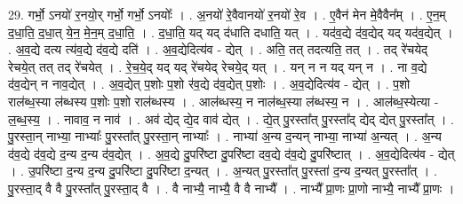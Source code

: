 \documentclass[17pt]{extarticle}
\begin{document}
29. गर्भो॒ ऽनयो॑ र॒नयो॒र् गर्भो॒ गर्भो॒ ऽनयोः᳚ । . अ॒नयो॑ रे॒वैवानयो॑ र॒नयो॑ रे॒व । . ए॒वैन॑ मेन मे॒वैवैन᳚म् । . ए॒न॒म् द॒धा॒ति॒ द॒धा॒त् ये॒न॒ मे॒न॒म् द॒धा॒ति॒ । . द॒धा॒ति॒ यद् यद् द॑धाति दधाति॒ यत् । . यद॑व॒द्ये द॑व॒द्येद् यद् यद॑व॒द्येत् । . अ॒व॒द्ये दत्य त्य॑व॒द्ये द॑व॒द्ये दति॑ । . अ॒व॒द्येदित्य॑व - द्येत् । . अति॒ तत् तदत्यति॒ तत् । . तद् रे॑चयेद् रेचये॒त् तत् तद् रे॑चयेत् । . रे॒च॒ये॒द् यद् यद् रे॑चयेद् रेचये॒द् यत् । . यन् न न यद् यन् न । . ना व॒द्ये द॑व॒द्येन् न नाव॒द्येत् । . अ॒व॒द्येत् प॒शोः प॒शो र॑व॒द्ये द॑व॒द्येत् प॒शोः । . अ॒व॒द्येदित्य॑व - द्येत् । . प॒शो राल॑ब्ध॒स्या ल॑ब्धस्य प॒शोः प॒शो राल॑ब्धस्य । . आल॑ब्धस्य॒ न नाल॑ब्ध॒स्या ल॑ब्धस्य॒ न । . आल॑ब्ध॒स्येत्या - ल॒ब्ध॒स्य॒ । . नावाव॒ न नाव॑ । . अव॑ द्येद् द्ये॒द वाव॑ द्येत् । . द्ये॒त् पु॒रस्ता᳚त् पु॒रस्ता᳚द् द्येद् द्येत् पु॒रस्ता᳚त् । . पु॒रस्ता॒न् नाभ्या॒ नाभ्याः᳚ पु॒रस्ता᳚त् पु॒रस्ता॒न् नाभ्याः᳚ । . नाभ्या॑ अ॒न्य द॒न्यन् नाभ्या॒ नाभ्या॑ अ॒न्यत् । . अ॒न्य द॑व॒द्ये द॑व॒द्ये द॒न्य द॒न्य द॑व॒द्येत् । . अ॒व॒द्ये दु॒परि॑ष्टा दु॒परि॑ष्टा दव॒द्ये द॑व॒द्ये दु॒परि॑ष्टात् । . अ॒व॒द्येदित्य॑व - द्येत् । . उ॒परि॑ष्टा द॒न्य द॒न्य दु॒परि॑ष्टा दु॒परि॑ष्टा द॒न्यत् । . अ॒न्यत् पु॒रस्ता᳚त् पु॒रस्ता॑ द॒न्य द॒न्यत् पु॒रस्ता᳚त् । . पु॒रस्ता॒द् वै वै पु॒रस्ता᳚त् पु॒रस्ता॒द् वै । . वै नाभ्यै॒ नाभ्यै॒ वै वै नाभ्यै᳚ । . नाभ्यै᳚ प्रा॒णः प्रा॒णो नाभ्यै॒ नाभ्यै᳚ प्रा॒णः । \newline
\end{document}
